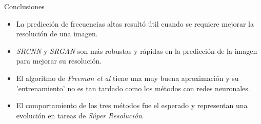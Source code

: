 \begin{frame}{Conclusiones}
    \begin{block}{}
        \begin{itemize}
            \item La predicción de frecuencias altas resultó útil cuando se 
            requiere mejorar la resolución de una imagen.
            \pause
            \item \emph{SRCNN} y \emph{SRGAN} son más robustas y rápidas en la predicción 
            de la imagen para mejorar su resolución. 
            \pause
            \item El algoritmo de \emph{Freeman et al} tiene una muy buena aproximación
            y su 'entrenamiento' no es tan tardado como los métodos con redes neuronales. 
            \pause
            \item El comportamiento de los tres métodos fue el esperado y representan
            una evolución en tareas de \emph{Súper Resolución}. 
        \end{itemize}
    \end{block}
\end{frame}